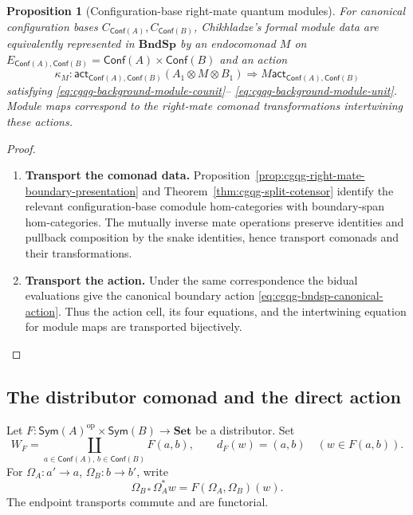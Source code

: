 \documentclass[oneside]{article}
\newcommand{\Conf}{\mathsf{Conf}}
\newcommand{\Sym}{\mathsf{Sym}}
\newcommand{\op}{\mathrm{op}}
\newcommand{\act}{\mathsf{act}}
\theoremstyle{plain}
\newtheorem{proposition}[theorem]{Proposition}
\theoremstyle{definition}
\theoremstyle{remark}
\begin{document}
\begin{proposition}[Configuration-base right-mate quantum modules]
\label{prop:cgqg-configuration-qmodule-right-mate}
For canonical configuration bases \(C_{\Conf(A)},C_{\Conf(B)}\), Chikhladze's
formal module data are equivalently represented in \(\mathbf{BndSp}\) by
an endocomonad \(M\) on \(E_{\Conf(A),\Conf(B)}=\Conf(A)\times\Conf(B)\) and an action
\[
 \kappa_M:\act_{\Conf(A),\Conf(B)}(A_1\otimes M\otimes B_1)
 \Longrightarrow M\act_{\Conf(A),\Conf(B)}
\]
satisfying \eqref{eq:cgqg-background-module-counit}--%
\eqref{eq:cgqg-background-module-unit}. Module maps correspond to the
right-mate comonad transformations intertwining these actions.
\end{proposition}
\begin{proof}
    \leavevmode
    \begin{enumerate}[beginpenalty=10000]
        \item \textbf{Transport the comonad data.}
        Proposition~\ref{prop:cgqg-right-mate-boundary-presentation} and
        Theorem~\ref{thm:cgqg-split-cotensor} identify the relevant
        configuration-base comodule hom-categories with boundary-span
        hom-categories. The mutually inverse mate operations preserve
        identities and pullback composition by the snake identities, hence
        transport comonads and their transformations.

        \item \textbf{Transport the action.}
        Under the same correspondence the bidual evaluations give the
        canonical boundary action \eqref{eq:cgqg-bndsp-canonical-action}.
        Thus the action cell, its four equations, and the intertwining
        equation for module maps are transported bijectively. \qedhere
    \end{enumerate}
\end{proof}

\subsection{The distributor comonad and the direct action}
\label{subsec:cgqg-distributor-carrier}

Let \(F:\Sym(A)^\op\times \Sym(B)\to\mathbf{Set}\) be a distributor. Set
\begin{equation}
 W_F=\coprod_{a\in \Conf(A),\,b\in \Conf(B)}F(a,b),
 \qquad d_F(w)=(a,b)\quad(w\in F(a,b)).
 \label{eq:cgqg-distributor-total-set}
\end{equation}
For \(\Omega_A:a'\to a\), \(\Omega_B:b\to b'\), write
\[
 \Omega_{B*}\Omega_A^*w=F(\Omega_A,\Omega_B)(w).
\]
The endpoint transports commute and are functorial.
\end{document}
